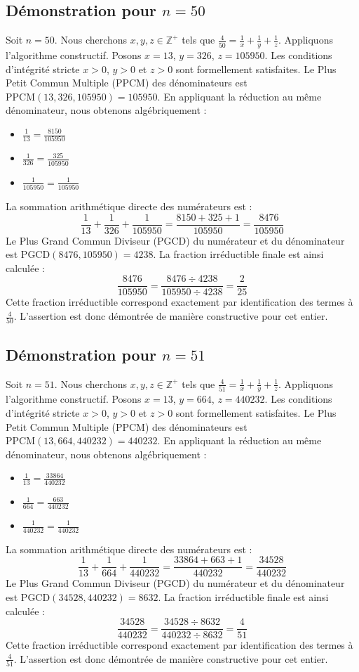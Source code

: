 \documentclass[11pt,a4paper]{article}
\begin{document}
\subsection{Démonstration pour $n = 50$}
Soit $n = 50$. Nous cherchons $x, y, z \in \mathbb{Z}^{+}$ tels que $\frac{4}{50} = \frac{1}{x} + \frac{1}{y} + \frac{1}{z}$.
Appliquons l'algorithme constructif. Posons $x = 13$, $y = 326$, $z = 105950$.
Les conditions d'intégrité stricte $x > 0$, $y > 0$ et $z > 0$ sont formellement satisfaites.
Le Plus Petit Commun Multiple (PPCM) des dénominateurs est $\text{PPCM}(13, 326, 105950) = 105950$.
En appliquant la réduction au même dénominateur, nous obtenons algébriquement :
\begin{itemize}
    \item $\frac{1}{13} = \frac{8150}{105950}$
    \item $\frac{1}{326} = \frac{325}{105950}$
    \item $\frac{1}{105950} = \frac{1}{105950}$
\end{itemize}
La sommation arithmétique directe des numérateurs est :
$$ \frac{1}{13} + \frac{1}{326} + \frac{1}{105950} = \frac{8150 + 325 + 1}{105950} = \frac{8476}{105950} $$
Le Plus Grand Commun Diviseur (PGCD) du numérateur et du dénominateur est $\text{PGCD}(8476, 105950) = 4238$.
La fraction irréductible finale est ainsi calculée :
$$ \frac{8476}{105950} = \frac{8476 \div 4238}{105950 \div 4238} = \frac{2}{25} $$
Cette fraction irréductible correspond exactement par identification des termes à $\frac{4}{50}$. L'assertion est donc démontrée de manière constructive pour cet entier.

\subsection{Démonstration pour $n = 51$}
Soit $n = 51$. Nous cherchons $x, y, z \in \mathbb{Z}^{+}$ tels que $\frac{4}{51} = \frac{1}{x} + \frac{1}{y} + \frac{1}{z}$.
Appliquons l'algorithme constructif. Posons $x = 13$, $y = 664$, $z = 440232$.
Les conditions d'intégrité stricte $x > 0$, $y > 0$ et $z > 0$ sont formellement satisfaites.
Le Plus Petit Commun Multiple (PPCM) des dénominateurs est $\text{PPCM}(13, 664, 440232) = 440232$.
En appliquant la réduction au même dénominateur, nous obtenons algébriquement :
\begin{itemize}
    \item $\frac{1}{13} = \frac{33864}{440232}$
    \item $\frac{1}{664} = \frac{663}{440232}$
    \item $\frac{1}{440232} = \frac{1}{440232}$
\end{itemize}
La sommation arithmétique directe des numérateurs est :
$$ \frac{1}{13} + \frac{1}{664} + \frac{1}{440232} = \frac{33864 + 663 + 1}{440232} = \frac{34528}{440232} $$
Le Plus Grand Commun Diviseur (PGCD) du numérateur et du dénominateur est $\text{PGCD}(34528, 440232) = 8632$.
La fraction irréductible finale est ainsi calculée :
$$ \frac{34528}{440232} = \frac{34528 \div 8632}{440232 \div 8632} = \frac{4}{51} $$
Cette fraction irréductible correspond exactement par identification des termes à $\frac{4}{51}$. L'assertion est donc démontrée de manière constructive pour cet entier.
\end{document}
